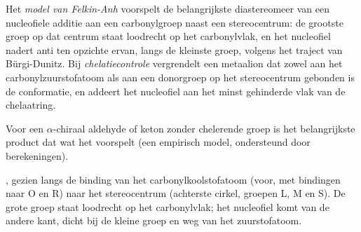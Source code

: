 \begin{definition}\label{def:b3:asymmetric-synthesis:felkin}
Het \emph{model van Felkin-Anh} voorspelt de
belangrijkste diastereomeer van een nucleofiele additie aan een
carbonylgroep naast een stereocentrum: de grootste groep op dat centrum
staat loodrecht op het carbonylvlak, en het nucleofiel nadert anti ten
opzichte ervan, langs de kleinste groep, volgens het traject van
Bürgi-Dunitz. Bij
\emph{chelatiecontrole} vergrendelt een metaalion
dat zowel aan het carbonylzuurstofatoom als aan een donorgroep op het
stereocentrum gebonden is de conformatie, en addeert het nucleofiel aan
het minst gehinderde vlak van de chelaatring.
\end{definition}

\begin{proposition}\label{prop:b3:asymmetric-synthesis:felkin}
Voor een $\alpha$-chiraal aldehyde of keton zonder chelerende groep is het
belangrijkste product dat wat het  voorspelt (een
empirisch model, ondersteund door berekeningen). \admitted
\end{proposition}

\begin{omfigure}

{\small {}, gezien langs de binding van het
carbonylkoolstofatoom (voor, met bindingen naar O en R) naar het
stereocentrum (achterste cirkel, groepen L, M en S). De grote groep staat
loodrecht op het carbonylvlak; het nucleofiel komt van de andere kant,
dicht bij de kleine groep en weg van het zuurstofatoom.}
\end{omfigure}

